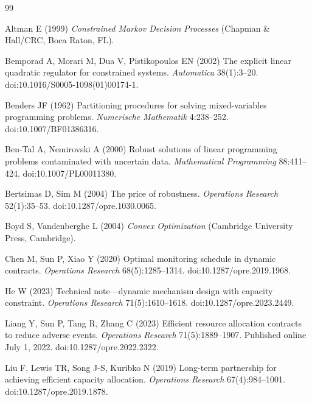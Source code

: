 \begin{thebibliography}{99}\raggedright
{}
Altman E (1999) \emph{Constrained Markov Decision Processes} (Chapman \& Hall/CRC, Boca Raton, FL).

Bemporad A, Morari M, Dua V, Pistikopoulos EN (2002) The explicit linear quadratic regulator for constrained systems. \emph{Automatica} 38(1):3--20. doi:10.1016/S0005-1098(01)00174-1.

Benders JF (1962) Partitioning procedures for solving mixed-variables programming problems. \emph{Numerische Mathematik} 4:238--252. doi:10.1007/BF01386316.

Ben-Tal A, Nemirovski A (2000) Robust solutions of linear programming problems contaminated with uncertain data. \emph{Mathematical Programming} 88:411--424. doi:10.1007/PL00011380.

Bertsimas D, Sim M (2004) The price of robustness. \emph{Operations Research} 52(1):35--53. doi:10.1287/opre.1030.0065.

Boyd S, Vandenberghe L (2004) \emph{Convex Optimization} (Cambridge University Press, Cambridge).

Chen M, Sun P, Xiao Y (2020) Optimal monitoring schedule in dynamic contracts. \emph{Operations Research} 68(5):1285--1314. doi:10.1287/opre.2019.1968.

He W (2023) Technical note---dynamic mechanism design with capacity constraint. \emph{Operations Research} 71(5):1610--1618. doi:10.1287/opre.2023.2449.

Liang Y, Sun P, Tang R, Zhang C (2023) Efficient resource allocation contracts to reduce adverse events. \emph{Operations Research} 71(5):1889--1907. Published online July 1, 2022. doi:10.1287/opre.2022.2322.

Liu F, Lewis TR, Song J-S, Kuribko N (2019) Long-term partnership for achieving efficient capacity allocation. \emph{Operations Research} 67(4):984--1001. doi:10.1287/opre.2019.1878.


\end{thebibliography}
